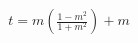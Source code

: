 \documentclass[preview]{standalone}
\begin{document}
\begin{align*}
t = m(\frac{1-m^{2}}{1+m^{2}}) + m
\end{align*}
\end{document}

